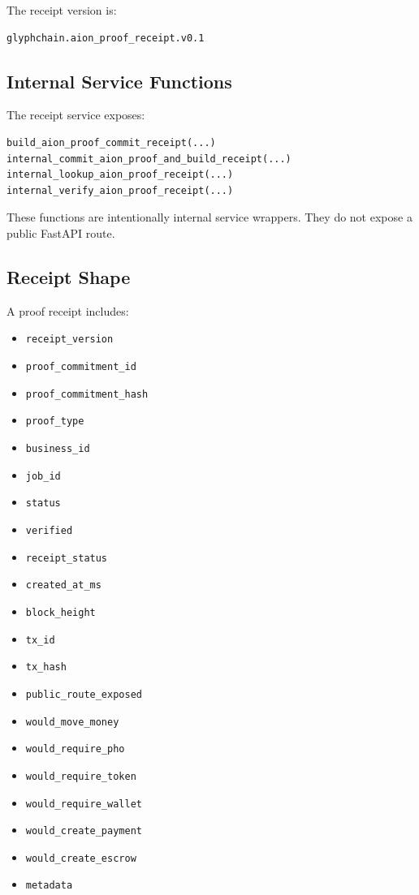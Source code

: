 The receipt version is:

\begin{verbatim}
glyphchain.aion_proof_receipt.v0.1
\end{verbatim}

\subsection{Internal Service Functions}

The receipt service exposes:

\begin{verbatim}
build_aion_proof_commit_receipt(...)
internal_commit_aion_proof_and_build_receipt(...)
internal_lookup_aion_proof_receipt(...)
internal_verify_aion_proof_receipt(...)
\end{verbatim}

These functions are intentionally internal service wrappers. They do not expose a public FastAPI route.

\subsection{Receipt Shape}

A proof receipt includes:

\begin{itemize}
  \item \texttt{receipt\_version}
  \item \texttt{proof\_commitment\_id}
  \item \texttt{proof\_commitment\_hash}
  \item \texttt{proof\_type}
  \item \texttt{business\_id}
  \item \texttt{job\_id}
  \item \texttt{status}
  \item \texttt{verified}
  \item \texttt{receipt\_status}
  \item \texttt{created\_at\_ms}
  \item \texttt{block\_height}
  \item \texttt{tx\_id}
  \item \texttt{tx\_hash}
  \item \texttt{public\_route\_exposed}
  \item \texttt{would\_move\_money}
  \item \texttt{would\_require\_pho}
  \item \texttt{would\_require\_token}
  \item \texttt{would\_require\_wallet}
  \item \texttt{would\_create\_payment}
  \item \texttt{would\_create\_escrow}
  \item \texttt{metadata}
\end{itemize}

